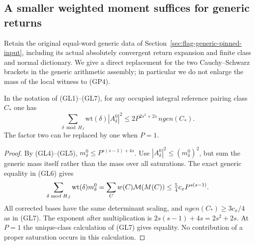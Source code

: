 \subsection{A smaller weighted moment suffices for generic returns}
\label{sec:flag-generic-reduced-moment}

Retain the original equal-word generic data of
Section~\ref{sec:flag-generic-pinned-input}, including its
actual absolutely convergent return expansion and finite
class and normal dictionary. We give a direct replacement
for the two Cauchy--Schwarz brackets in the generic
arithmetic assembly; in particular we do not enlarge
the mass of the local witness to (GP4).

\begin{lemma}
\label{lem:flag-generic-only-local}
In the notation of (GL1)--(GL7), for any occupied integral
reference pairing class \(C_*\) one has
\[
 \sum_{\delta\bmod H_J}\mathrm{wt}(\delta)|A_\delta^0|^2
 \le 2P^{2s^2+2s}\,ngen(C_*).
 \tag{RM1}
\]
The factor two can be replaced by one when \(P=1\).
\end{lemma}
\begin{proof}
By (GL4)--(GL5),
\(m_\delta^0\le P^{s(s-1)+4s}\).
Use \(|A_\delta^0|^2\le(m_\delta^0)^2\), but sum the
generic mass itself rather than the mass over all
saturations. The exact generic equality in (GL6) gives
\[
 \sum_{\delta\bmod H_J}\mathrm{wt}(\delta)m_\delta^0
   =\sum_C w(C){\cal M}(M(C))
   \le \tfrac54 c_x P^{s(s-1)} .
\]
All corrected bases have the same determinant scaling,
and \(ngen(C_*)\ge3c_x/4\) as in (GL7).
The exponent after multiplication is
\(2s(s-1)+4s=2s^2+2s\).
At \(P=1\) the unique-class calculation of (GL7)
gives equality. No contribution of a proper saturation
occurs in this calculation.
\end{proof}

